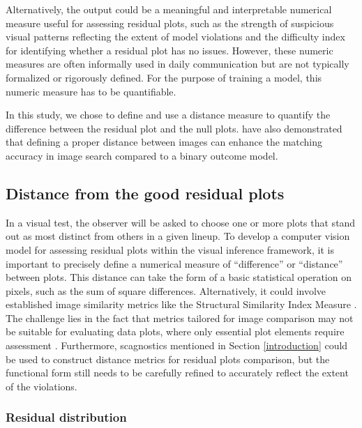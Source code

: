\documentclass[]{interact}
\theoremstyle{plain}%
\theoremstyle{definition}
\theoremstyle{remark}
\begin{document}
Alternatively, the output could be a meaningful and interpretable
numerical measure useful for assessing residual plots, such as the
strength of suspicious visual patterns reflecting the extent of model
violations and the difficulty index for identifying whether a residual
plot has no issues. However, these numeric measures are often informally
used in daily communication but are not typically formalized or
rigorously defined. For the purpose of training a model, this numeric
measure has to be quantifiable.

In this study, we chose to define and use a distance measure to quantify
the difference between the residual plot and the null plots.
\citet{vo2016localizing} have also demonstrated that defining a proper
distance between images can enhance the matching accuracy in image
search compared to a binary outcome model.

\subsection{Distance from the good residual
plots}\label{distance-from-the-good-residual-plots}

In a visual test, the observer will be asked to choose one or more plots
that stand out as most distinct from others in a given lineup. To
develop a computer vision model for assessing residual plots within the
visual inference framework, it is important to precisely define a
numerical measure of ``difference'' or ``distance'' between plots. This
distance can take the form of a basic statistical operation on pixels,
such as the sum of square differences. Alternatively, it could involve
established image similarity metrics like the Structural Similarity
Index Measure \citep{wang2004image}. The challenge lies in the fact that
metrics tailored for image comparison may not be suitable for evaluating
data plots, where only essential plot elements require assessment
\citep{chowdhury2018measuring}. Furthermore, scagnostics mentioned in
Section \ref{introduction} could be used to construct distance metrics
for residual plots comparison, but the functional form still needs to be
carefully refined to accurately reflect the extent of the violations.

\subsubsection{Residual distribution}\label{residual-distribution}
\end{document}
